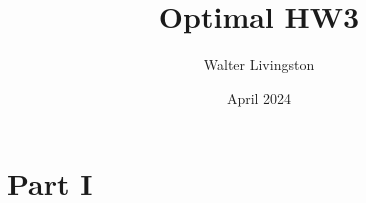 \documentclass{article}
\title{Optimal HW3}
\author{Walter Livingston}
\date{April 2024}
\begin{document}
\maketitle

\section*{Part I}
\end{document}
